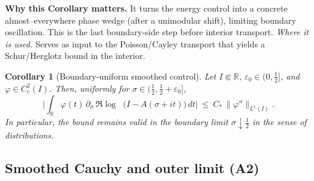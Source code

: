\documentclass[11pt]{article}
\newtheorem{corollary}{Corollary}[section]
\theoremstyle{definition}
\theoremstyle{remark}
\newcommand{\R}{\mathbb{R}}
\DeclareMathOperator{\dettwo}{det_2}
\begin{document}
\vspace{1.0cm}
\noindent\textbf{Why this Corollary matters.} It turns the energy control into a concrete almost--everywhere phase wedge (after a unimodular shift), limiting boundary oscillation. This is the last boundary-side step before interior transport.
\noindent\textit{Where it is used.} Serves as input to the Poisson/Cayley transport that yields a Schur/Herglotz bound in the interior.
\begin{corollary}[Boundary-uniform smoothed control]\label{cor:det2-boundary}
Let $I\Subset\R$, $\varepsilon_0\in(0,\tfrac12]$, and $\varphi\in C_c^2(I)$. Then, uniformly for $\sigma\in(\tfrac12,\tfrac12+\varepsilon_0]$,
\[
  \Big|\int_{\R} \varphi(t)\,\partial_\sigma\,\Re\log\dettwo\big(I-A(\sigma+it)\big)\,dt\Big|\ \le\ C_*\,\|\varphi''\|_{L^1(I)}.
\]
In particular, the bound remains valid in the boundary limit $\sigma\downarrow \tfrac12$ in the sense of distributions.
\end{corollary}




\vspace{1.0cm}
\subsection*{Smoothed Cauchy and outer limit (A2)}
\end{document}
